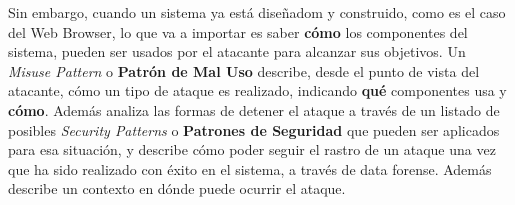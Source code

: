 Sin embargo, cuando un sistema ya está diseñadom y construido, como es el caso del Web Browser, lo que va a importar es saber \textbf{cómo} los componentes del sistema, pueden ser usados por el atacante para alcanzar sus objetivos. Un \textit{Misuse Pattern} o \textbf{Patrón de Mal Uso} describe, desde el punto de vista del atacante, cómo un tipo de ataque es realizado, indicando \textbf{qué} componentes usa y \textbf{cómo}. Además analiza las formas de detener el ataque a través de un listado de posibles \textit{Security Patterns} o \textbf{Patrones de Seguridad} que pueden ser aplicados para esa situación, y describe cómo poder seguir el rastro de un ataque una vez que ha sido realizado con éxito en el sistema, a través de data forense. Además describe un contexto en dónde puede ocurrir el ataque.

